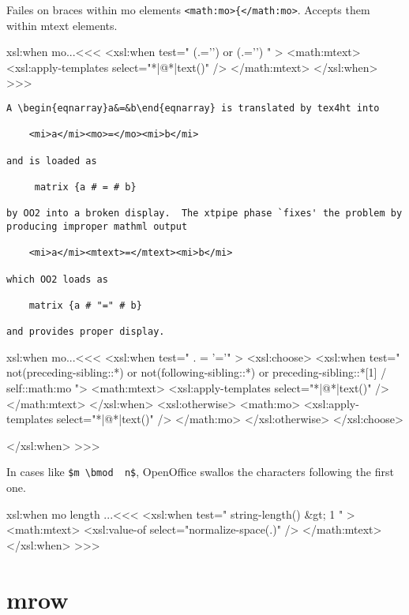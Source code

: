 \documentclass{article}
\begin{document}
Failes on braces within mo elements \verb+<math:mo>{</math:mo>+.
Accepts them within mtext elements.


\<xsl:when mo...\><<<
<xsl:when test=" 
   (.='{') or (.='}')
" >
   <math:mtext>
      <xsl:apply-templates select="*|@*|text()" />
   </math:mtext>
</xsl:when> 
>>>



\begin{verbatim}
A \begin{eqnarray}a&=&b\end{eqnarray} is translated by tex4ht into 
 
    <mi>a</mi><mo>=</mo><mi>b</mi> 
 
and is loaded as 
 
     matrix {a # = # b} 
 
by OO2 into a broken display.  The xtpipe phase `fixes' the problem by 
producing improper mathml output 
 
    <mi>a</mi><mtext>=</mtext><mi>b</mi> 
 
which OO2 loads as 
 
    matrix {a # "=" # b} 
 
and provides proper display.  
\end{verbatim}





\<xsl:when mo...\><<<
<xsl:when test="  . = '='" >
  <xsl:choose>
     <xsl:when test="   not(preceding-sibling::*)
                     or not(following-sibling::*)
                     or preceding-sibling::*[1] / self::math:mo
     ">
        <math:mtext>
           <xsl:apply-templates select="*|@*|text()" />
        </math:mtext>
     </xsl:when>
     <xsl:otherwise>
        <math:mo>
           <xsl:apply-templates select="*|@*|text()" />
        </math:mo>
     </xsl:otherwise>
  </xsl:choose>

</xsl:when> 
>>>




In cases like \verb!$m \bmod  n$!, OpenOffice swallos the characters following the first one.

\<xsl:when mo length ...\><<<
<xsl:when test=" string-length() &gt; 1 " >
   <math:mtext>
      <xsl:value-of select="normalize-space(.)" />
   </math:mtext>
</xsl:when> 
>>>


\section{mrow}
\end{document}
